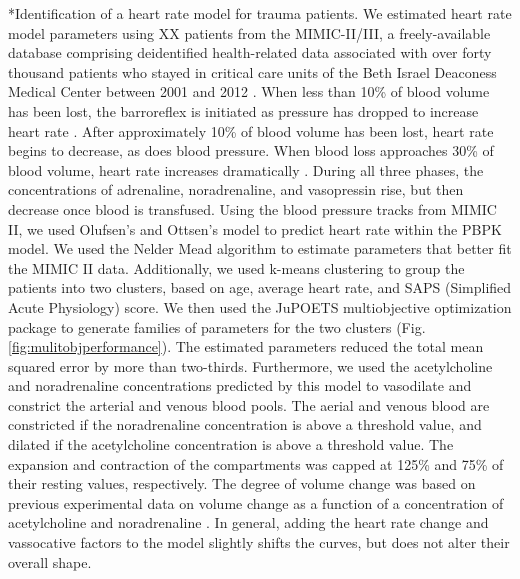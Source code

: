 \documentclass[12pt]{article}
\makeatletter
\renewcommand\paragraph{\@startsection
  {paragraph}{2}{0mm}
  {-0.05in}
  {-0.5\baselineskip}
  {\normalfont\normalsize\itshape}}
\makeatother
\begin{document}
\paragraph*{Identification of a heart rate model for trauma patients.}
We estimated heart rate model parameters using XX patients from the MIMIC-II/III, a freely-available database comprising deidentified health-related data associated with
over forty thousand patients who stayed in critical care units of the Beth Israel Deaconess Medical Center between 2001 and 2012 \cite{Johnson:2016aa}.
When less than 10\% of blood volume has been lost, the barroreflex is initiated as pressure has dropped to increase heart rate \cite{foex1999systemic}.
After approximately 10\% of blood volume has been lost, heart rate begins to decrease, as does blood pressure.
When blood loss approaches 30\% of blood volume, heart rate increases dramatically \cite{jacobsen1990cardiovascular}.
During all three phases, the concentrations of adrenaline, noradrenaline, and vasopressin rise, but then decrease once blood is transfused.
Using the blood pressure tracks from MIMIC II, we used Olufsen's and Ottsen's model \cite{olufsen2013practical} to predict heart rate within the PBPK model.
We used the Nelder Mead algorithm to estimate parameters that better fit the MIMIC II data.
Additionally, we used k-means clustering to group the patients into two clusters, based on age, average heart rate, and SAPS (Simplified Acute Physiology) score.
We then used the JuPOETS multiobjective optimization package \cite{bassen2016jupoets} to generate families of parameters for the two clusters (Fig. \ref{fig:mulitobjperformance}).
The estimated parameters reduced the total mean squared error by more than two-thirds. Furthermore, we used the acetylcholine and noradrenaline concentrations predicted by this model to vasodilate and constrict the arterial and venous blood pools. The aerial and venous blood are constricted if the noradrenaline concentration is above a threshold value, and dilated if the acetylcholine concentration is above a threshold value. The expansion and contraction of the compartments was capped at 125\% and 75\% of their resting values, respectively. The degree of volume change was based on previous experimental data on volume change as a function of a concentration of acetylcholine and noradrenaline \cite{chowienczyk1994blood,dora1983effect}.
In general, adding the heart rate change and vassocative factors to the model slightly shifts the curves, but does not alter their overall shape.
\end{document}
